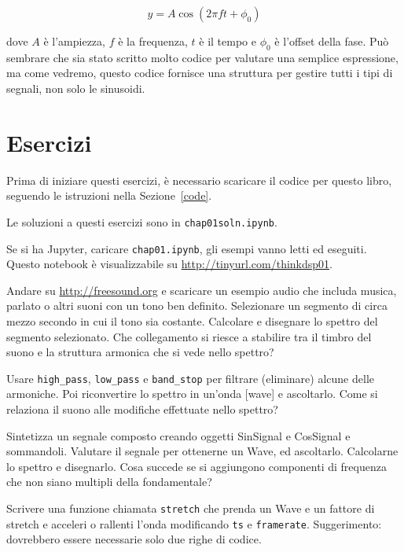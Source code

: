 \documentclass[12pt,a4paper]{book}
\begin{document}
%
\[ y = A \cos (2 \pi f t + \phi_0) \] 

%
dove $A$ è l'ampiezza, $f$ è la frequenza, $t$ è il tempo e $\phi_0$ è l'offset della fase. Può sembrare che sia stato scritto molto codice per valutare una semplice espressione, ma come vedremo, questo codice fornisce una struttura per gestire tutti i tipi di segnali, non solo le sinusoidi.

\section{Esercizi} 

Prima di iniziare questi esercizi, è necessario scaricare il codice per questo libro, seguendo le istruzioni nella Sezione~\ref{code}.

Le soluzioni a questi esercizi sono in {\tt chap01soln.ipynb}.

\begin{exercise} Se si ha Jupyter, caricare {\tt chap01.ipynb}, gli esempi vanno letti ed eseguiti. Questo notebook è visualizzabile su \url{http://tinyurl.com/thinkdsp01}. \end{exercise} 

\begin{exercise} Andare su \url{http://freesound.org} e scaricare un esempio audio che includa musica, parlato o altri suoni con un tono ben definito. Selezionare un segmento di circa mezzo secondo in cui il tono sia costante. Calcolare e disegnare lo spettro del segmento selezionato. Che collegamento si riesce a stabilire tra il timbro del suono e la struttura armonica che si vede nello spettro?

Usare \verb"high_pass", \verb"low_pass" e \verb"band_stop" per filtrare (eliminare) alcune delle armoniche. Poi riconvertire lo spettro in un'onda [wave] e ascoltarlo. Come si relaziona il suono alle modifiche effettuate nello spettro? \end{exercise} 

\begin{exercise} Sintetizza un segnale composto creando oggetti SinSignal e CosSignal e sommandoli. Valutare il segnale per ottenerne un Wave, ed ascoltarlo. Calcolarne lo spettro e disegnarlo. Cosa succede se si aggiungono componenti di frequenza che non siano multipli della fondamentale? \end{exercise} 

\begin{exercise} Scrivere una funzione chiamata {\tt stretch} che prenda un Wave e un fattore di stretch e acceleri o rallenti l'onda modificando {\tt ts} e {\tt framerate}. Suggerimento: dovrebbero essere necessarie solo due righe di codice. \end{exercise} 
\end{document}
